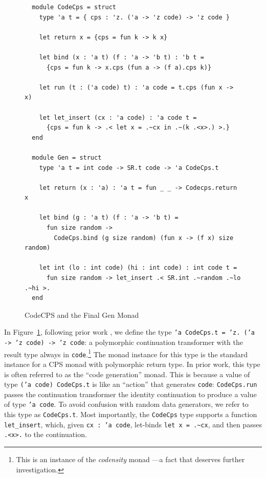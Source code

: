 \documentclass[acmsmall]{acmart}
\theoremstyle{definition}
\begin{document}
\begin{figure}[h]
  \begin{lstlisting}
  module CodeCps = struct
    type 'a t = { cps : 'z. ('a -> 'z code) -> 'z code }

    let return x = {cps = fun k -> k x}

    let bind (x : 'a t) (f : 'a -> 'b t) : 'b t =
      {cps = fun k -> x.cps (fun a -> (f a).cps k)}

    let run (t : ('a code) t) : 'a code = t.cps (fun x -> x)

    let let_insert (cx : 'a code) : 'a code t =
      {cps = fun k -> .< let x = .~cx in .~(k .<x>.) >.}
  end

  module Gen = struct
    type 'a t = int code -> SR.t code -> 'a CodeCps.t

    let return (x : 'a) : 'a t = fun _ _ -> Codecps.return x

    let bind (g : 'a t) (f : 'a -> 'b t) =
      fun size random ->
        CodeCps.bind (g size random) (fun x -> (f x) size random)

    let int (lo : int code) (hi : int code) : int code t =
      fun size random -> let_insert .< SR.int .~random .~lo .~hi >.
  end
  \end{lstlisting}
  \caption{CodeCPS and the Final Gen Monad}
  \label{fig:codecps-and-final-gen}
  \end{figure}

In Figure~\ref{fig:codecps-and-final-gen}, following prior work \cite{kovacs24, carrette05}, we define
the type \texttt{'a CodeCps.t = 'z. ('a -> 'z code) -> 'z code}: a polymorphic continuation transformer with the result type
always in \texttt{code}.\footnote{This is an instance of the \emph{codensity} monad \cite{janis08}---a fact that deserves further investigation.}
The monad instance for this type is the standard instance for a CPS monad with polymorphic return type.
In prior work, this type is often referred to as the ``code generation'' monad.
This is because a value of type \texttt{('a code) CodeCps.t} is like an ``action'' that generates \texttt{code}:
\texttt{CodeCps.run} passes the continuation transformer the identity continuation to produce a value of type \texttt{'a code}.
To avoid confusion with random data generators, we refer to this type as \texttt{CodeCps.t}.
Most importantly, the \texttt{CodeCps} type supports a function \texttt{let\_insert}, which, given \texttt{cx : 'a code},
let-binds \texttt{let x = .\~{}cx}, and then passes \texttt{.<x>.} to the
continuation.
\end{document}
